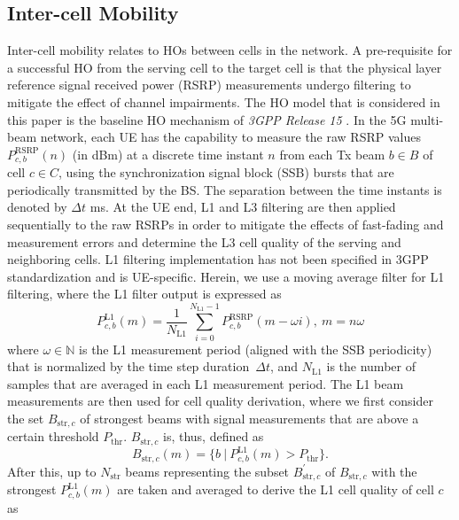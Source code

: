 \documentclass[10pt, conference]{IEEEtran}
\begin{document}
\subsection{Inter-cell Mobility} \label{Subsection2.1}
Inter-cell mobility relates to HOs between cells in the network. A pre-requisite for a  successful HO from the serving cell to the target cell is that the physical layer reference signal received power (RSRP) measurements undergo filtering to mitigate the effect of channel impairments. The HO model that is considered in this paper is the baseline HO mechanism of \textit{3GPP Release 15} \cite{b7, b8}. In the 5G multi-beam network, each UE has the capability to measure the raw RSRP values $P_{c,b}^\textrm{RSRP}(n)$ (in dBm) at a discrete time instant $n$ from each Tx beam $b \in B$ of cell $c \in C$, using the synchronization signal block (SSB) bursts that are periodically transmitted by the BS. The separation between the time instants is denoted by $\Delta t$ ms. At the UE end, L1 and L3 filtering are then applied sequentially to the raw RSRPs in order to mitigate the effects of fast-fading and measurement errors and determine the L3 cell quality of the serving and neighboring cells. L1 filtering implementation has not been specified in 3GPP standardization and is UE-specific. Herein, we use a moving average filter for L1 filtering, where the L1 filter output is expressed as
%
\vspace{-0.2\baselineskip}
\begin{equation}
\label{Eq1}
    P_{c,b}^\textrm{L1}(m) = \frac{1}{N_\mathrm{L1}} \sum_{i=0}^{N_\mathrm{L1}-1}P_{c,b}^\textrm{RSRP}(m-\omega i), \ m = n\omega 
\end{equation}
%
where $\omega \in \mathbb{N}$ is the L1 measurement period (aligned with the SSB periodicity) that is normalized by the time step duration~$\Delta t$, and $N_\mathrm{L1}$ is the number of samples that are averaged in each L1 measurement period. The L1 beam measurements are then used for cell quality derivation, where we first consider the set $B_{\mathrm{str},c}$ of strongest beams with signal measurements that are above a certain threshold $P_{\mathrm{thr}}$. $B_{\mathrm{str},c}$ is, thus, defined as
%
\vspace{-0.2\baselineskip}
\begin{equation}
\label{Eq2}
    B_{\mathrm{str},c}(m) = \big\{b \  | \ P_{c,b}^\textrm{L1}(m) > P_{\mathrm{thr}} \big\}.
\end{equation}
%
After this, up to $N_\mathrm{str}$ beams representing the subset $B_{\mathrm{str},c}^{\prime}$ of $B_{\mathrm{str},c}$ with the strongest  $P_{c,b}^\textrm{L1}(m)$ are taken and averaged to derive the L1 cell quality of cell $c$ as 
\end{document}
